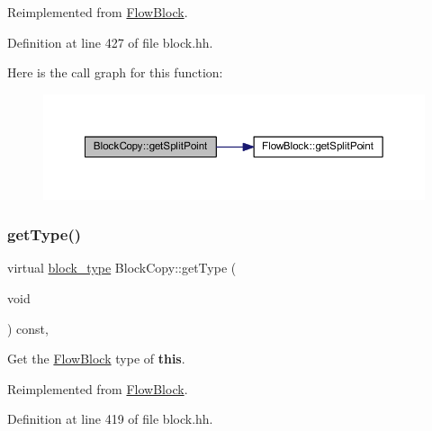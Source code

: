 Reimplemented from \mbox{\hyperlink{class_flow_block_a20996aacbad259e2e4a7bb0c72482335}{Flow\+Block}}.



Definition at line 427 of file block.\+hh.

Here is the call graph for this function\+:
\nopagebreak
\begin{figure}[H]
\begin{center}
\leavevmode
\includegraphics[width=350pt]{class_block_copy_a86c90bb0020298ac2287ff5ab46af8a2_cgraph}
\end{center}
\end{figure}
\mbox{\label{class_block_copy_aab8dda53eba113d624cbd3b22b0c58c1}} 
\subsubsection{\texorpdfstring{getType()}{getType()}}
{\footnotesize\ttfamily virtual \mbox{\hyperlink{class_flow_block_a70df78390870fcdd51e31426ba6a193e}{block\+\_\+type}} Block\+Copy\+::get\+Type (\begin{DoxyParamCaption}\item[{void}]{ }\end{DoxyParamCaption}) const\hspace{0.3cm}{\ttfamily [inline]}, {\ttfamily [virtual]}}



Get the \mbox{\hyperlink{class_flow_block}{Flow\+Block}} type of {\bfseries{this}}. 



Reimplemented from \mbox{\hyperlink{class_flow_block_ae036068cc610d97a5461f9bcf75bd43d}{Flow\+Block}}.



Definition at line 419 of file block.\+hh.

\mbox{\label{class_block_copy_a3187e07356b398d20f12e36691522ced}} 
